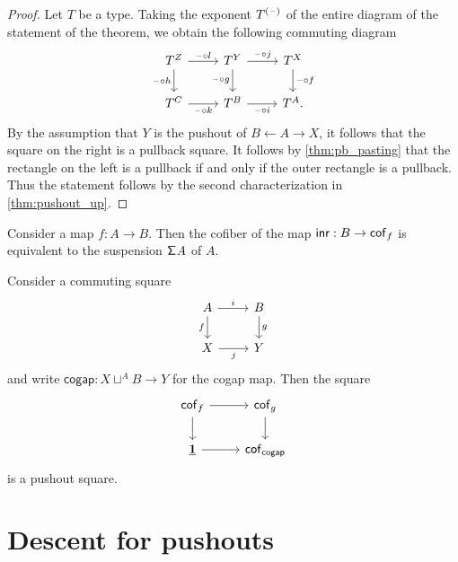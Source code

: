 \begin{proof}
Let $T$ be a type. Taking the exponent $T^{(\mathord{\hspace{1pt}\text{--}\hspace{1pt}})}$ of the entire diagram of the statement of the theorem, we obtain the following commuting diagram
\begin{equation*}
\begin{tikzcd}
T^Z \arrow[r,"\blank\circ l"] \arrow[d,swap,"\blank\circ h"] & T^Y \arrow[d,swap,"\blank\circ g"] \arrow[r,"\blank\circ j"] & T^X \arrow[d,"\blank\circ f"] \\
T^C \arrow[r,swap,"\blank\circ k"] & T^B \arrow[r,swap,"\blank\circ i"] & T^A.
\end{tikzcd}
\end{equation*}
By the assumption that $Y$ is the pushout of $B\leftarrow A \rightarrow X$, it follows that the square on the right is a pullback square. It follows by \autoref{thm:pb_pasting} that the rectangle on the left is a pullback if and only if the outer rectangle is a pullback. Thus the statement follows by the second characterization in \autoref{thm:pushout_up}.
\end{proof}

\begin{lem}
Consider a map $f:A\to B$. Then the cofiber of the map ${\mathsf{inr}}:B\to \mathsf{cof}_f$ is equivalent to the suspension $\mathsf{\Sigma}^{}{A}$ of $A$. 
\end{lem}

\begin{thm}
Consider a commuting square
\begin{equation*}
\begin{tikzcd}
A \arrow[r,"i"] \arrow[d,swap,"f"] & B \arrow[d,"g"] \\
X \arrow[r,swap,"j"] & Y
\end{tikzcd}
\end{equation*}
and write $\mathsf{cogap}: X\sqcup^A B\to Y$ for the cogap map. 
Then the square
\begin{equation*}
\begin{tikzcd}
\mathsf{cof}_f \arrow[d] \arrow[r] & \mathsf{cof}_g \arrow[d] \\
\unit \arrow[r] & \mathsf{cof}_{\mathsf{cogap}}
\end{tikzcd}
\end{equation*}
is a pushout square.
\end{thm}

\section{Descent for pushouts}\label{sec:descent}

